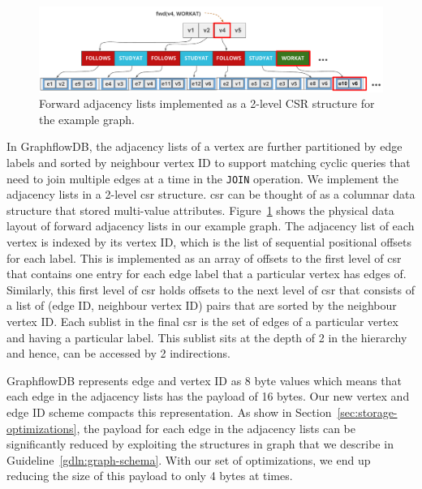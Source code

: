 \begin{figure}
	\hspace{-15pt}
	\hfill\includegraphics[scale=0.75]{img/adjlists}\hspace*{\fill}
	\captionsetup{justification=centering}
	\caption{Forward adjacency lists implemented as a 2-level CSR structure for the example graph.}
	\label{fig:adjlists}
\end{figure}

In GraphflowDB, the adjacency lists of a vertex are further partitioned by edge labels and sorted by neighbour vertex ID to support matching cyclic queries that need to join multiple edges at a time in the \texttt{JOIN} operation. We implement the adjacency lists in a 2-level \gls{csr} structure. \gls{csr} can be thought of as a columnar data structure that stored multi-value attributes. Figure~\ref{fig:adjlists} shows the physical data layout of forward adjacency lists in our example graph. The adjacency list of each vertex is indexed by its vertex ID, which is the list of sequential positional offsets for each label. This is implemented as an array of offsets to the first level of \gls{csr} that contains one entry for each edge label that a particular vertex has edges of. Similarly, this first level of \gls{csr} holds offsets to the next level of \gls{csr} that consists of a list of (edge ID, neighbour vertex ID) pairs that are sorted by the neighbour vertex ID. Each sublist in the final \gls{csr} is the set of edges of a particular vertex and having a particular label. This sublist sits at the depth of 2 in the hierarchy and hence, can be accessed by 2 indirections.

GraphflowDB represents edge and vertex ID as 8 byte values which means that each edge in the adjacency lists has the payload of 16 bytes. Our new vertex and edge ID scheme compacts this representation. As show in Section~\ref{sec:storage-optimizations}, the payload for each edge in the adjacency lists can be significantly reduced by exploiting the structures in graph that we describe in Guideline~\ref{gdln:graph-schema}. With our set of optimizations, we end up reducing the size of this payload to only 4 bytes at times.

